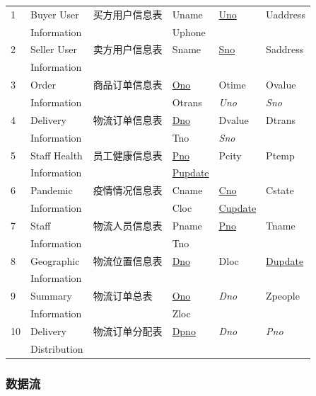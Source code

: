 \documentclass[12pt]{article}
\begin{document}
\begin{center}
\begin{supertabular}{llllll}
1 &	Buyer User &	买方用户信息表 & Uname &	\uline{Uno} &	Uaddress  \\ & Information &&	Uphone && \\
2 &	Seller User &	卖方用户信息表 & Sname &	\uline{Sno} &	Saddress \\ & Information &&&& \\
3 &	Order  & 商品订单信息表 &	\uline{Ono} &	Otime &	Ovalue  \\
& Information &&	Otrans & \textit{Uno} &	\textit{Sno}  \\
4 &	Delivery &	物流订单信息表 &	\uline{Dno} &	Dvalue &	Dtrans  \\ & Information && Tno &	\textit{Sno} & \\
5 &	Staff Health &	员工健康信息表 &	\uline{Pno} &	Pcity & Ptemp \\ 
& Information && \uline{Pupdate} && \\
6 &	Pandemic &	疫情情况信息表 &	Cname &	\uline{Cno} &	Cstate \\	& Information &&  Cloc & \uline{Cupdate}	& \\
7 &Staff  &	物流人员信息表 &	Pname &	\uline{Pno} &	Tname \\ & Information	& & Tno && \\
8 &	Geographic  &	物流位置信息表 &	\uline{Dno} &	Dloc &	\uline{Dupdate} \\& Information&&&& \\
9 & Summary & 物流订单总表 & \uline{Ono} & \textit{Dno} & Zpeople \\ & Information && Zloc && \\
10 & Delivery & 物流订单分配表 & \uline{Dpno} & \textit{Dno} & \textit{Pno}\\ & Distribution &&&& \\
\end{supertabular}
\end{center}

\subsubsection{数据流}

\tabletail{\bottomrule}
\end{document}
